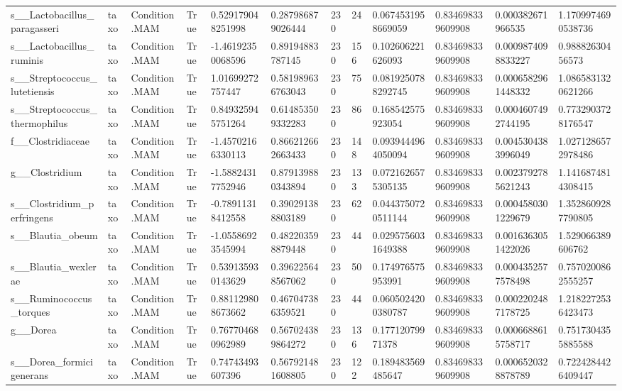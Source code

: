 \begin{longtable}{llllllllllll}
s\_\_Lactobacillus\_paragasseri & taxo & Condition.MAM & True & 0.529179048251998 & 0.287986879026444 & 230 & 24 & 0.0674531958669059 & 0.834698339609908 & 0.000382671966535 & 1.1709974690538736 \\
s\_\_Lactobacillus\_ruminis & taxo & Condition.MAM & True & -1.46192350068596 & 0.89194883787145 & 230 & 156 & 0.102606221626093 & 0.834698339609908 & 0.0009874098833227 & 0.98882630456573 \\
s\_\_Streptococcus\_lutetiensis & taxo & Condition.MAM & True & 1.01699272757447 & 0.581989636763043 & 230 & 75 & 0.0819250788292745 & 0.834698339609908 & 0.0006582961448332 & 1.0865831320621266 \\
s\_\_Streptococcus\_thermophilus & taxo & Condition.MAM & True & 0.849325945751264 & 0.614853509332283 & 230 & 86 & 0.168542575923054 & 0.834698339609908 & 0.0004607492744195 & 0.7732903728176547 \\
f\_\_Clostridiaceae & taxo & Condition.MAM & True & -1.45702166330113 & 0.866212662663433 & 230 & 148 & 0.0939444964050094 & 0.834698339609908 & 0.0045304383996049 & 1.0271286572978486 \\
g\_\_Clostridium & taxo & Condition.MAM & True & -1.58824317752946 & 0.879139880343894 & 230 & 133 & 0.0721626575305135 & 0.834698339609908 & 0.0023792785621243 & 1.1416874814308415 \\
s\_\_Clostridium\_perfringens & taxo & Condition.MAM & True & -0.78911318412558 & 0.390291388803189 & 230 & 62 & 0.0443750720511144 & 0.834698339609908 & 0.0004580301229679 & 1.3528609287790805 \\
s\_\_Blautia\_obeum & taxo & Condition.MAM & True & -1.05586923545994 & 0.482203598879448 & 230 & 44 & 0.0295756031649388 & 0.834698339609908 & 0.0016363051422026 & 1.529066389606762 \\
s\_\_Blautia\_wexlerae & taxo & Condition.MAM & True & 0.539135930143629 & 0.396225648567062 & 230 & 50 & 0.174976575953991 & 0.834698339609908 & 0.0004352577578498 & 0.7570200862555257 \\
s\_\_Ruminococcus\_torques & taxo & Condition.MAM & True & 0.881129808673662 & 0.467047386359521 & 230 & 44 & 0.0605024200380787 & 0.834698339609908 & 0.0002202487178725 & 1.2182272536423473 \\
g\_\_Dorea & taxo & Condition.MAM & True & 0.767704680962989 & 0.567024389864272 & 230 & 136 & 0.17712079971378 & 0.834698339609908 & 0.0006688615758717 & 0.7517304355885588 \\
s\_\_Dorea\_formicigenerans & taxo & Condition.MAM & True & 0.74743493607396 & 0.567921481608805 & 230 & 122 & 0.189483569485647 & 0.834698339609908 & 0.0006520328878789 & 0.7224284426409447 \\

\end{longtable}
